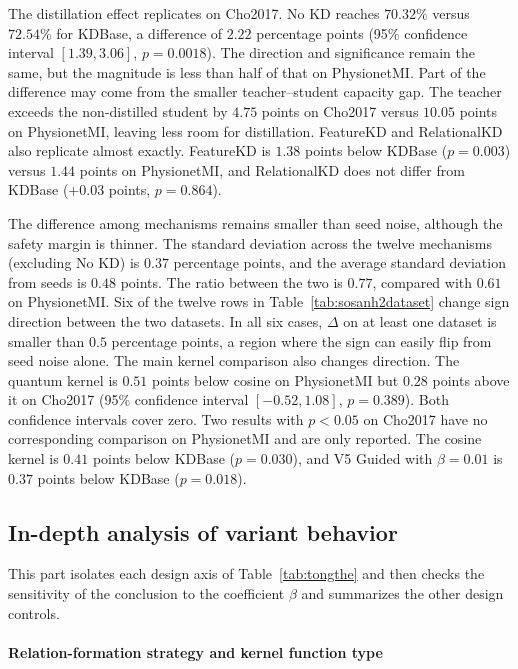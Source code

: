 The distillation effect replicates on Cho2017. No KD reaches $70.32\%$
versus $72.54\%$ for KDBase, a difference of $2.22$ percentage points
(95\% confidence interval $[1.39, 3.06]$, $p = 0.0018$). The direction
and significance remain the same, but the magnitude is less than half
of that on PhysionetMI. Part of the difference may come from the
smaller teacher--student capacity gap. The teacher exceeds the
non-distilled student by $4.75$ points on Cho2017 versus $10.05$ points
on PhysionetMI, leaving less room for distillation. FeatureKD and
RelationalKD also replicate almost exactly. FeatureKD is $1.38$ points
below KDBase ($p = 0.003$) versus $1.44$ points on PhysionetMI, and
RelationalKD does not differ from KDBase ($+0.03$ points, $p = 0.864$).

The difference among mechanisms remains smaller than seed noise,
although the safety margin is thinner. The standard deviation across
the twelve mechanisms (excluding No KD) is $0.37$ percentage points,
and the average standard deviation from seeds is $0.48$ points. The
ratio between the two is $0.77$, compared with $0.61$ on PhysionetMI.
Six of the twelve rows in Table~\ref{tab:sosanh2dataset} change sign
direction between the two datasets. In all six cases, $\Delta$ on at
least one dataset is smaller than $0.5$ percentage points, a region
where the sign can easily flip from seed noise alone. The main kernel
comparison also changes direction. The quantum kernel is $0.51$ points
below cosine on PhysionetMI but $0.28$ points above it on Cho2017 (95\%
confidence interval $[-0.52, 1.08]$, $p = 0.389$). Both confidence
intervals cover zero. Two results with $p < 0.05$ on Cho2017 have no
corresponding comparison on PhysionetMI and are only reported. The
cosine kernel is $0.41$ points below KDBase ($p = 0.030$), and V5 Guided
with $\beta = 0.01$ is $0.37$ points below KDBase ($p = 0.018$).

\subsection{In-depth analysis of variant behavior}
\label{sec:chuyensau}

This part isolates each design axis of Table~\ref{tab:tongthe} and then
checks the sensitivity of the conclusion to the coefficient $\beta$ and
summarizes the other design controls.

\paragraph{Relation-formation strategy and kernel function type}

